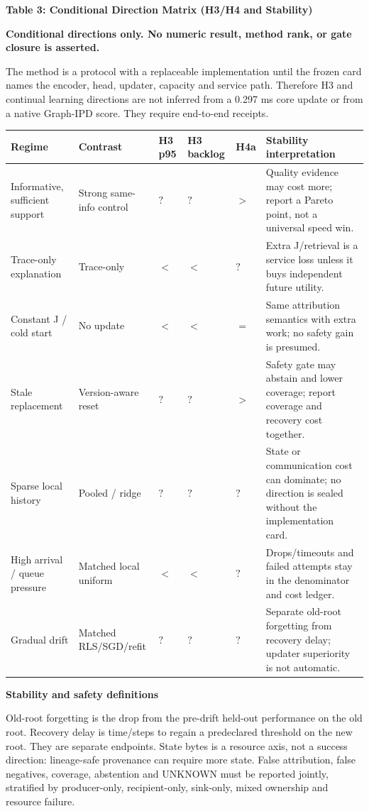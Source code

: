 \documentclass[10pt,a4paper]{article}
\newcommand{\lead}[1]{\vspace{3pt}\textbf{#1}\par}
\newcommand{\caution}{\textcolor{red!70!black}{\textbf{Conditional directions only. No numeric result, method rank, or gate closure is asserted.}}\par}
\begin{document}
\clearpage
{\large\bfseries Table 3: Conditional Direction Matrix (H3/H4 and Stability)}\par\caution
The method is a protocol with a replaceable implementation until the frozen card names
the encoder, head, updater, capacity and service path. Therefore H3 and continual
learning directions are not inferred from a 0.297 ms core update or from a native
Graph-IPD score. They require end-to-end receipts.

\begin{center}\scriptsize
\begin{tabularx}{\linewidth}{@{}L{.20\linewidth}L{.25\linewidth}C{.07\linewidth}C{.07\linewidth}C{.07\linewidth}X@{}}\toprule
Regime & Contrast & H3 p95 & H3 backlog & H4a & Stability interpretation\\\midrule
Informative, sufficient support & Strong same-info control & $?$ & $?$ & $>$ & Quality evidence may cost more; report a Pareto point, not a universal speed win.\\
Trace-only explanation & Trace-only & $<$ & $<$ & $?$ & Extra J/retrieval is a service loss unless it buys independent future utility.\\
Constant J / cold start & No update & $<$ & $<$ & $=$ & Same attribution semantics with extra work; no safety gain is presumed.\\
Stale replacement & Version-aware reset & $?$ & $?$ & $>$ & Safety gate may abstain and lower coverage; report coverage and recovery cost together.\\
Sparse local history & Pooled / ridge & $?$ & $?$ & $?$ & State or communication cost can dominate; no direction is sealed without the implementation card.\\
High arrival / queue pressure & Matched local uniform & $<$ & $<$ & $?$ & Drops/timeouts and failed attempts stay in the denominator and cost ledger.\\
Gradual drift & Matched RLS/SGD/refit & $?$ & $?$ & $?$ & Separate old-root forgetting from recovery delay; updater superiority is not automatic.\\\bottomrule
\end{tabularx}\end{center}

\lead{Stability and safety definitions}
Old-root forgetting is the drop from the pre-drift held-out performance on the old
root. Recovery delay is time/steps to regain a predeclared threshold on the new root.
They are separate endpoints. State bytes is a resource axis, not a success direction:
lineage-safe provenance can require more state. False attribution, false negatives,
coverage, abstention and UNKNOWN must be reported jointly, stratified by producer-only,
recipient-only, sink-only, mixed ownership and resource failure.
\end{document}
